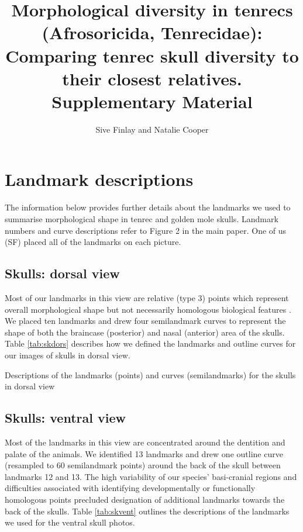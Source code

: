 \documentclass[12pt,a4paper]{article}
\begin{document}
\title{
       Morphological diversity in tenrecs (Afrosoricida, Tenrecidae): Comparing tenrec skull diversity to their closest relatives.\\
       \bigskip
       Supplementary Material }
\author{Sive Finlay and Natalie Cooper}
\date{}
\maketitle
\section{Landmark descriptions}
	The information below provides further details about the landmarks we used to summarise morphological shape in tenrec and golden mole skulls. Landmark numbers and curve descriptions refer to Figure 2 in the main paper. One of us (SF) placed all of the landmarks on each picture.

\subsection{Skulls: dorsal view}
	Most of our landmarks in this view are relative (type 3) points which represent overall morphological shape but not necessarily homologous biological features \citep{Zelditch2012}. We placed ten landmarks and drew four semilandmark curves to represent the shape of both the braincase (posterior) and nasal (anterior) area of the skulls. Table \ref{tab:skdors} describes how we defined the landmarks and outline curves for our images of skulls in dorsal view.

\begin{table}[h]
	\caption[Skulls: dorsal landmarks]
		{Descriptions of the landmarks (points) and curves (semilandmarks) for the skulls in dorsal view} 
	
	\label{tab:skdors}
\end{table}

\subsection{Skulls: ventral view}
	Most of the landmarks in this view are concentrated around the dentition and palate of the animals. We identified 13 landmarks and drew one outline curve (resampled to 60 semilandmark points) around the back of the skull between landmarks 12 and 13. The high variability of our species' basi-cranial regions and difficulties associated with identifying developmentally or functionally homologous points precluded designation of additional landmarks towards the back of the skulls. Table \ref{tab:skvent} outlines the descriptions of the landmarks we used for the ventral skull photos.
\end{document}
